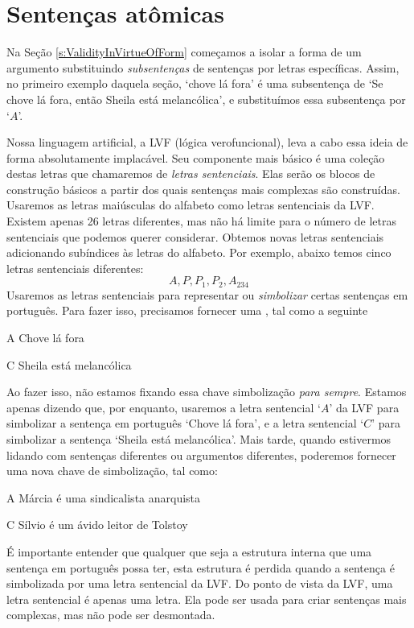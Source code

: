 \section{Sentenças atômicas}

Na Seção \ref{s:ValidityInVirtueOfForm} começamos a isolar a forma de um argumento substituindo \emph{subsentenças} de sentenças por letras específicas.
Assim, no primeiro exemplo daquela seção, `chove lá fora' é uma subsentença de `Se chove lá fora, então Sheila está melancólica', e substituímos essa subsentença por `$A$'.

Nossa linguagem artificial, a LVF (lógica verofuncional), leva a cabo essa ideia de forma absolutamente implacável.
Seu componente mais básico é uma coleção destas letras que chamaremos de \emph{letras sentenciais}.
Elas serão os blocos de construção básicos a partir dos quais sentenças mais complexas são construídas.
Usaremos as letras maiúsculas do alfabeto como letras sentenciais da LVF.
Existem apenas 26 letras diferentes, mas não há limite para o número de letras sentenciais que podemos querer considerar.
Obtemos novas letras sentenciais adicionando subíndices às letras do alfabeto.
Por exemplo, abaixo temos cinco letras sentenciais diferentes:
	$$A, P, P_1, P_2, A_{234}$$
Usaremos as letras sentenciais para representar ou \emph{simbolizar} certas sentenças em português.
Para fazer isso, precisamos fornecer uma , tal como a seguinte
	\begin{ekey}
		\item[A] Chove lá fora
		\item[C] Sheila está melancólica
	\end{ekey}
Ao fazer isso, não estamos fixando essa chave simbolização \emph{para sempre}.
Estamos apenas dizendo que, por enquanto, usaremos a letra sentencial `$A$'  da LVF para simbolizar a sentença em português `Chove lá fora', e a letra sentencial `$C$' para simbolizar a sentença `Sheila está melancólica'.
Mais tarde, quando estivermos lidando com sentenças diferentes ou argumentos diferentes, poderemos fornecer uma nova chave de simbolização, tal como:
	\begin{ekey}
		\item[A] Márcia é uma sindicalista anarquista
		\item[C] Sílvio é um ávido leitor de Tolstoy
	\end{ekey}
É importante entender que qualquer que seja a estrutura interna que uma sentença em português possa ter, esta estrutura é perdida quando a sentença é simbolizada por uma letra sentencial da LVF.
Do ponto de vista da LVF, uma letra sentencial é apenas uma letra.
Ela pode ser usada para criar sentenças mais complexas, mas não pode ser desmontada.

